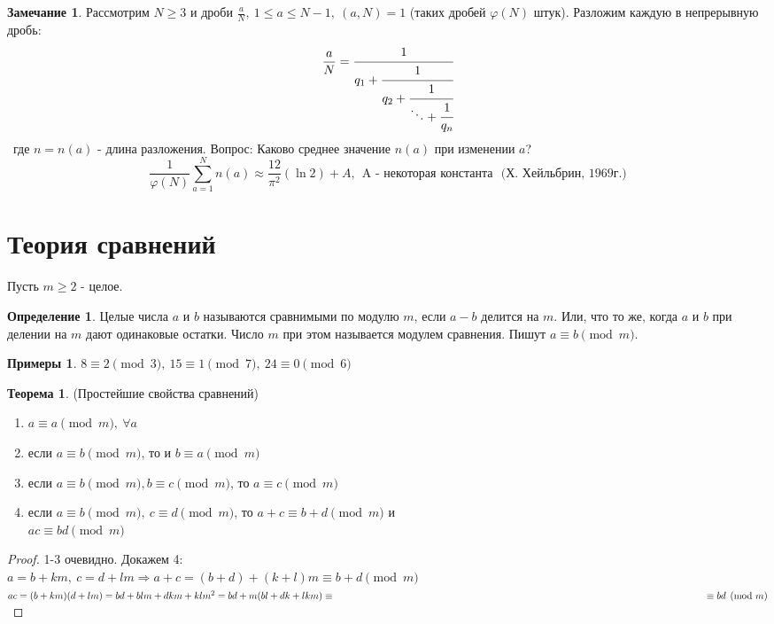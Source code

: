 \documentclass[a4paper, 12pt]{article}
\renewcommand{\phi}{\varphi}
\newcommand\tab[1][.5cm]{\hspace*{#1}}
\theoremstyle{definition}
\newtheorem{definition}{Определение}[section]
\newtheorem{theorem}{Теорема}[section]
\newtheorem*{comm}{Замечание}
\newtheorem*{examples}{Примеры}
\begin{document}
    \begin{comm}
        Рассмотрим $N\geq 3$ и дроби $\frac{a}{N},\ 1\leq a\leq N-1,\ (a,N)=1$ (таких дробей $\phi(N)$ штук). Разложим каждую в непрерывную дробь:
        \[\frac{a}{N}=\cfrac{1}{q_1+\cfrac{1}{q_2+\cfrac{1}{\ddots+\cfrac{1}{q_n}}}}\]\
        где $n=n(a)$ - длина разложения.
        Вопрос: Каково среднее значение $n(a)$ при изменении $a$?
        \[\frac{1}{\phi(N)}\sum\limits_{a=1}^N n(a)\approx \frac{12}{\pi^2}(\ln{2})+A,\ \ \text{A - некоторая константа}\ \ \ \text{(Х. Хейльбрин, 1969г.)}\]
    \end{comm}
    \section{Теория сравнений}
    Пусть $m\geq 2$ - целое.
    \begin{definition}
        Целые числа $a$ и $b$ называются сравнимыми по модулю $m$, если $a-b$ делится на $m$. Или, что то же, когда $a$ и $b$ при делении на $m$ дают одинаковые остатки. Число $m$ при этом называется модулем сравнения. Пишут $a\equiv b \pmod{m}$.
    \end{definition}
    \begin{examples}
        $8\equiv 2 \pmod{3},\ 15\equiv 1 \pmod{7},\ 24\equiv0 \pmod{6}$
    \end{examples}
    \begin{theorem} (Простейшие свойства сравнений)\label{th8.1}
         \begin{enumerate}
            \item $a\equiv a \pmod{m},\ \forall a$
            \item если $a\equiv b \pmod{m}$, то и $b\equiv a \pmod{m}$
            \item если $a\equiv b \pmod{m}, b\equiv c \pmod{m}$, то $a\equiv c \pmod{m}$
            \item если $a\equiv b \pmod{m},\ c\equiv d \pmod{m}$, то $a+c \equiv b+d \pmod{m}$ и\\
            $ac\equiv bd \pmod{m}$
         \end{enumerate}
    \end{theorem} 
    \begin{proof}
        1-3 очевидно. Докажем 4:\\
        $a=b+km,\ c=d+lm \Rightarrow a+c=(b+d)+(k+l)m\equiv b+d \pmod{m}$\\
        $ac=(b+km)(d+lm)=bd+blm+dkm+klm^2=bd+m(bl+dk+lkm)\equiv \\ \tab[13.5cm] \equiv bd \pmod{m}$
    \end{proof} 
\end{document}
